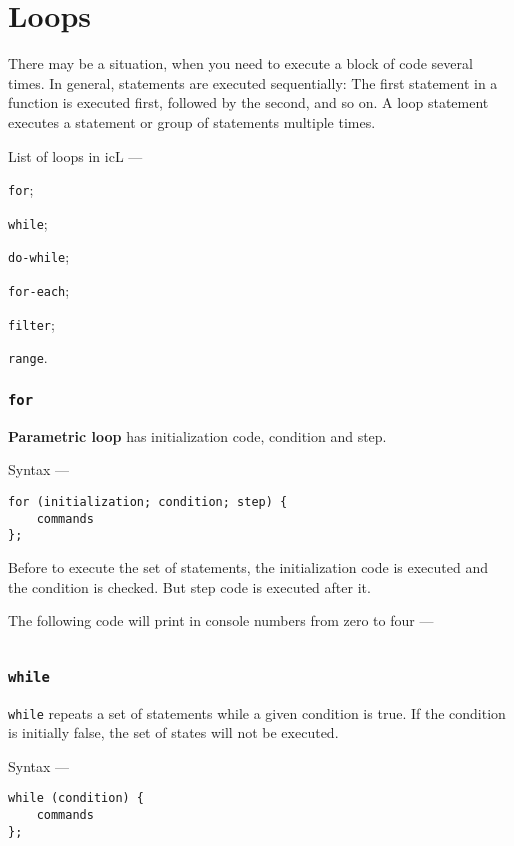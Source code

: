 \section{Loops}

There may be a situation, when you need to execute a block of code several times. In general, statements are executed sequentially: The first statement in a function is executed first, followed by the second, and so on. A loop statement executes a statement or group of statements multiple times. 

List of loops in icL —

\begin{icItems}
\item
	\texttt{for};
\item
	\texttt{while};
\item
	\texttt{do-while};
\item
	\texttt{for-each};
\item
	\texttt{filter};
\item
	\texttt{range}.
\end{icItems}


\subsubsection{\texttt{for}}

{\bf Parametric loop} has initialization code, condition and step. 

Syntax —
\begin{verbatim}
for (initialization; condition; step) {
	commands
};
\end{verbatim}

Before to execute the set of statements, the initialization code is executed and the condition is checked. But step code is executed after it.

The following code will print in console numbers from zero to four —
\inputminted[linenos]{icl}{../sources/uniloopex.icL}

\subsubsection{\texttt{while}}

\texttt{while} repeats a set of statements while a given condition is true. If the condition is initially false, the set of states will not be executed.

Syntax —
\begin{verbatim}
while (condition) {
	commands
};
\end{verbatim}

